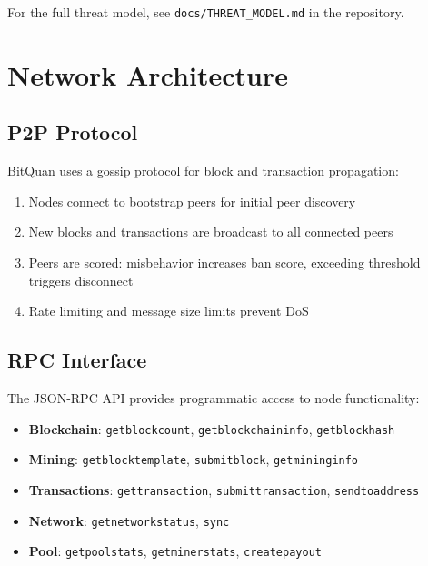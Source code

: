 \documentclass[11pt,a4paper]{article}
\begin{document}
For the full threat model, see \texttt{docs/THREAT\_MODEL.md} in the repository.

\section{Network Architecture}

\subsection{P2P Protocol}

BitQuan uses a gossip protocol for block and transaction propagation:

\begin{enumerate}
    \item Nodes connect to bootstrap peers for initial peer discovery
    \item New blocks and transactions are broadcast to all connected peers
    \item Peers are scored: misbehavior increases ban score, exceeding threshold triggers disconnect
    \item Rate limiting and message size limits prevent DoS
\end{enumerate}

\subsection{RPC Interface}

The JSON-RPC API provides programmatic access to node functionality:

\begin{itemize}[leftmargin=*]
    \item \textbf{Blockchain}: \texttt{getblockcount}, \texttt{getblockchaininfo}, \texttt{getblockhash}
    \item \textbf{Mining}: \texttt{getblocktemplate}, \texttt{submitblock}, \texttt{getmininginfo}
    \item \textbf{Transactions}: \texttt{gettransaction}, \texttt{submittransaction}, \texttt{sendtoaddress}
    \item \textbf{Network}: \texttt{getnetworkstatus}, \texttt{sync}
    \item \textbf{Pool}: \texttt{getpoolstats}, \texttt{getminerstats}, \texttt{createpayout}
\end{itemize}
\end{document}
